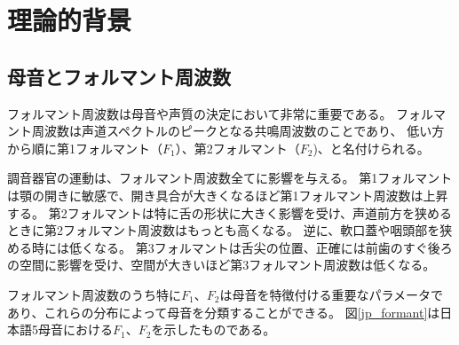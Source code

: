 \documentclass[10.5ptj,a4j,dvipdfmx,uplatex, oneside, openany, report]{jsbook}%
\begin{document}

\chapter{理論的背景}
\section{母音とフォルマント周波数}
フォルマント周波数は母音や声質の決定において非常に重要である。
フォルマント周波数は声道スペクトルのピークとなる共鳴周波数のことであり、
低い方から順に第1フォルマント（$F_1$）、第2フォルマント（$F_2$)、と名付けられる。

調音器官の運動は、フォルマント周波数全てに影響を与える。
第1フォルマントは顎の開きに敏感で、開き具合が大きくなるほど第1フォルマント周波数は上昇する。
第2フォルマントは特に舌の形状に大きく影響を受け、声道前方を狭めるときに第2フォルマント周波数はもっとも高くなる。
逆に、軟口蓋や咽頭部を狭める時には低くなる。
第3フォルマントは舌尖の位置、正確には前歯のすぐ後ろの空間に影響を受け、空間が大きいほど第3フォルマント周波数は低くなる。

フォルマント周波数のうち特に$F_1$、$F_2$は母音を特徴付ける重要なパラメータであり、これらの分布によって母音を分類することができる\cite{japanese_vowels}。
図\ref{jp_formant}は日本語5母音における$F_1$、$F_2$を示したものである。
\end{document}
